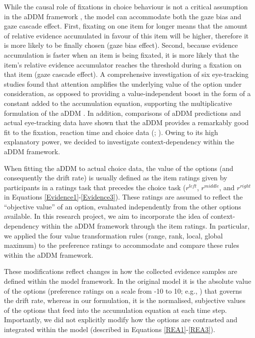 \documentclass[11pt,a4paper]{article}
\begin{document}
While the causal role of fixations in choice behaviour is not a critical assumption in the aDDM framework \cite{Krajbich2019}, the model can accommodate both the gaze bias and gaze cascade effect. First, fixating on one item for longer means that the amount of relative evidence accumulated in favour of this item will be higher, therefore it is more likely to be finally chosen (gaze bias effect). Second, because evidence accumulation is faster when an item is being fixated, it is more likely that the item's relative evidence accumulator reaches the threshold during a fixation on that item (gaze cascade effect). A comprehensive investigation of six eye-tracking studies found that attention amplifies the underlying value of the option under consideration, as opposed to providing a value-independent boost in the form of a constant added to the accumulation equation, supporting the multiplicative formulation of the aDDM \cite{Smith2019}. In addition, comparisons of aDDM predictions and actual eye-tracking data have shown that the aDDM provides a remarkably good fit to the fixation, reaction time and choice data (; ). Owing to its high explanatory power, we decided to investigate context-dependency within the aDDM framework. 

When fitting the aDDM to actual choice data, the value of the options (and consequently the drift rate) is usually defined as the item ratings given by participants in a ratings task that precedes the choice task ($r^{left}$, $r^{middle}$, and $r^{right}$ in Equations \ref{Evidence1}-\ref{Evidence3}). These ratings are assumed to reflect the “objective value” of an option, evaluated independently from the other options available. In this research project, we aim to incorporate the idea of context-dependency within the aDDM framework through the item ratings. In particular, we applied the four value transformation rules (range, rank, local, global maximum) to the preference ratings to accommodate and compare these rules within the aDDM framework.


These modifications reflect changes in how the collected evidence samples are defined within the model framework. In the original model it is the absolute value of the options (preference ratings on a scale from -10 to 10; e.g., ) that governs the drift rate, whereas in our formulation, it is the normalised, subjective values of the options that feed into the accumulation equation at each time step. Importantly, we did not explicitly modify how the options are contrasted and integrated within the model (described in Equations \ref{REA1}-\ref{REA3}).
\end{document}
